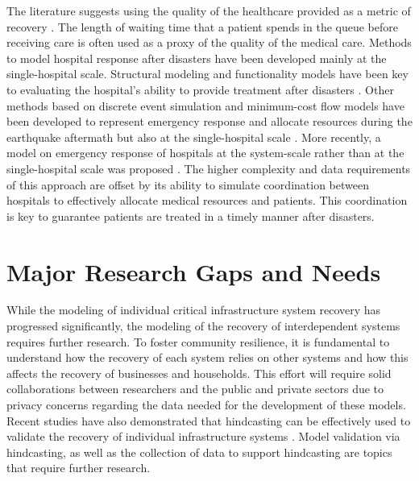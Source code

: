 The literature suggests using the quality of the healthcare provided as a metric of recovery \citep{vieth2006effect, hamby2004using}. The length of waiting time that a patient spends in the queue before receiving care is often used as a proxy of the quality of the medical care. Methods to model hospital response after disasters have been developed mainly at the single-hospital scale. Structural modeling and functionality models have been key to evaluating the hospital's ability to provide treatment after disasters \citep{yavari2010modeling, cimellaro2011performance, jacques2014resilience}. Other methods based on discrete event simulation and minimum-cost flow models have been developed to represent emergency response and allocate resources during the earthquake aftermath but also at the single-hospital scale \citep{yi2005real, gul2015comprehensive, vugrin2015modeling, aghapour2019capacity}. More recently, a model on emergency response of hospitals at the system-scale rather than at the single-hospital scale was proposed \citep{ceferino2019effective}. The higher complexity and data requirements of this approach are offset by its ability to simulate coordination between hospitals to effectively allocate medical resources and patients. This coordination is key to guarantee patients are treated in a timely manner after disasters.\

\section{Major Research Gaps and Needs}
While the modeling of individual critical infrastructure system recovery has progressed significantly, the modeling of the recovery of interdependent systems requires further research. To foster community resilience, it is fundamental to understand how the recovery of each system relies on other systems and how this affects the recovery of businesses and households. This effort will require solid collaborations between researchers and the public and private sectors due to privacy concerns regarding the data needed for the development of these models. Recent studies have also demonstrated that hindcasting can be effectively used to validate the recovery of individual infrastructure systems \citep{tomar2020hindcasting}. Model validation via hindcasting, as well as the collection of data to support hindcasting are topics that require further research. \

\FloatBarrier